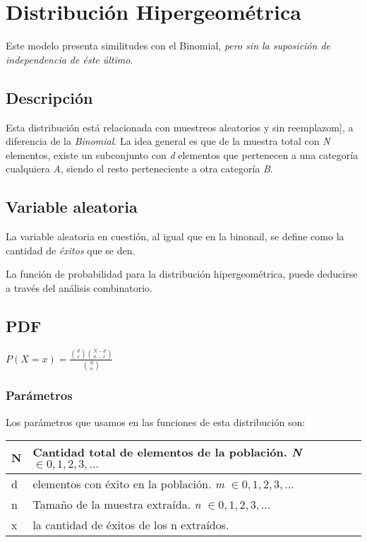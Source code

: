 \chapter{Distribución Hipergeométrica}

Este modelo presenta similitudes con el Binomial, \textit{pero sin la suposición de independencia de éste último}. \cite{wiki:2} \cite{hyp:1}

\section{Descripción}

Esta distribución está relacionada con muestreos aleatorios y sin reemplazom], a diferencia de la \textit{Binomial}. La idea general es que de la muestra total con \textit{N} elementos, existe un subconjunto con \textit{d} elementos que pertenecen a una categoría cualquiera \textit{A}, siendo el resto perteneciente a otra categoría \textit{B}.

\section{Variable aleatoria}
La variable aleatoria en cuestión, 	al igual que en la binonail, se define como la cantidad de \textit{éxitos} que se den.

La función de probabilidad para la distribución hipergeométrica, puede deducirse a través del análisis combinatorio.

\section{PDF}
\begin{center}
	$P(X=\textit{x})	= {\frac{ {d \choose x} {N - d \choose n-x} }{ {N \choose n} }} $
\end{center}

\subsection{Parámetros}
Los parámetros que usamos en las funciones de esta distribución son:

\begin{center}
	\begin{tabular} {| l | l |}
		\hline
		N & Cantidad total de elementos de la población. \textit{N} $\in 0, 1, 2, 3, ...$\\ \hline
		d & elementos con éxito en la población. \textit{m} $\in 0, 1, 2, 3, ...$ \\ \hline
		n & Tamaño de la muestra extraída. \textit{n} $\in 0, 1, 2, 3, ...$ \\ \hline
		x & la cantidad de éxitos de los n extraídos. \\ \hline
	\end{tabular}
\end{center}

